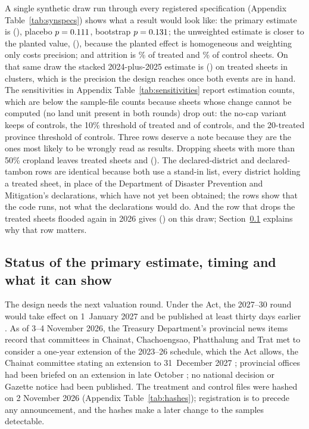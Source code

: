 A single synthetic draw run through every registered specification (Appendix Table~\ref{tab:synspecs}) shows what a result would look like: the primary estimate is \synPrimary{} (\synPrimarySe), placebo $p = 0.111$, bootstrap $p = 0.131$; the unweighted estimate is closer to the planted value, \synUnweighted{} (\synUnweightedSe), because the planted effect is homogeneous and weighting only costs precision; and attrition is \synAttritionT\% of treated and \synAttritionC\% of control sheets. On that same draw the stacked 2024-plus-2025 estimate is \sensStacked{} (\sensStackedSe) on \sensStackedTreated{} treated sheets in \sensStackedClusters{} clusters, which is the precision the design reaches once both events are in hand. The sensitivities in Appendix Table~\ref{tab:sensitivities} report estimation counts, which are below the sample-file counts because sheets whose change cannot be computed (no land unit present in both rounds) drop out: the no-cap variant keeps \sensNocapControlsEst{} of \sensNocapControls{} controls, the 10\% threshold \sensThrTenTreatedEst{} of \sensThrTenTreated{} treated and \sensThrTenControlsEst{} of \sensThrTenControls{} controls, and the 20-treated province threshold \sensProvTwentyControlsEst{} of \sensProvTwentyControls{} controls. Three rows deserve a note because they are the ones most likely to be wrongly read as results. Dropping sheets with more than 50\% cropland leaves \sensNocropTreated{} treated sheets and \sensNocrop{} (\sensNocropSe). The declared-district and declared-tambon rows are identical because both use a stand-in list, every district holding a treated sheet, in place of the Department of Disaster Prevention and Mitigation's declarations, which have not yet been obtained; the rows show that the code runs, not what the declarations would do. And the row that drops the \sensRefloodDropped{} treated sheets flooded again in 2026 gives \sensReflood{} (\sensRefloodSe) on this draw; Section~\ref{sec:status} explains why that row matters.

\subsection{Status of the primary estimate, timing and what it can show}\label{sec:status}

The design needs the next valuation round. Under the Act, the 2027--30 round would take effect on 1~January 2027 and be published at least thirty days earlier \citep{th2019valuationact}. As of 3--4 November 2026, the Treasury Department's provincial news items record that committees in Chainat, Chachoengsao, Phatthalung and Trat met to consider a one-year extension of the 2023--26 schedule, which the Act allows, the Chainat committee stating an extension to 31~December 2027 \citep{treasury2026chainat,treasury2026chachoengsao,treasury2026phatthalung,treasury2026trat}; provincial offices had been briefed on an extension in late October \citep{treasury2026extbriefing}; no national decision or Gazette notice had been published. The treatment and control files were hashed on 2 November 2026 (Appendix Table~\ref{tab:hashes}); registration is to precede any announcement, and the hashes make a later change to the samples detectable.

